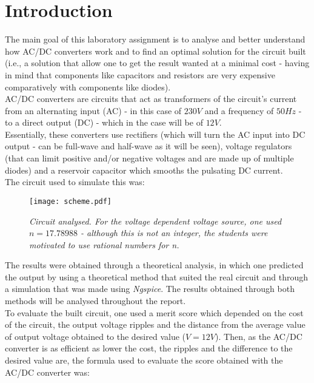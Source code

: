 \section{Introduction}
The main goal of this laboratory assignment is to analyse and better understand how AC/DC converters work and to find an optimal solution for the circuit built (i.e., a solution that allow one to get the result wanted at a minimal cost - having in mind that components like capacitors and resistors are very expensive comparatively with components like diodes).\\

AC/DC converters are circuits that act as transformers of the circuit's current from an alternating input (AC) - in this case of $230V$ and a frequency of $50Hz$ - to a direct output (DC) - which in the case will be of $12V$. \\

Essentially, these converters use rectifiers (which will turn the AC input into DC output - can be full-wave and half-wave as it will be seen), voltage regulators (that can limit positive and/or negative voltages and are made up of multiple diodes) and a reservoir capacitor which smooths the pulsating DC current.\\

The circuit used to simulate this was:

\begin{figure}[H]
    \centering
    \texttt{[image: scheme.pdf]}
            \caption{\textit{Circuit analysed. For the voltage dependent voltage source, one used $n = 17.78988$ - although this is not an integer, the students were motivated to use rational numbers for n.}}
    \label{fig:bigscheme}
\end{figure}

The results were obtained through a theoretical analysis, in which one predicted the output by using a theoretical method that suited the real circuit and through a simulation that was made using \textit{Ngspice}. The results obtained through both methods will be analysed throughout the report.\\

To evaluate the built circuit, one used a merit score which depended on the cost of the circuit, the output voltage ripples and the distance from the average value of output voltage obtained to the desired value ($V = 12V$). Then, as the AC/DC converter is as efficient as lower the cost, the ripples and the difference to the desired value are, the formula used to evaluate the score obtained with the AC/DC converter was:

